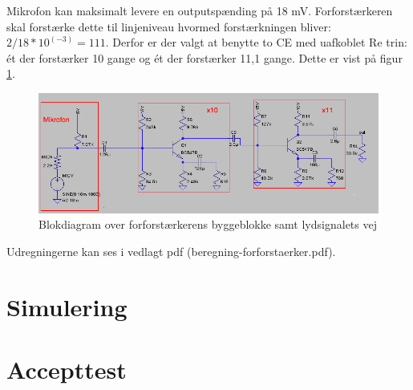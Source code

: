 Mikrofon kan maksimalt levere en outputspænding på 18 mV. Forforstærkeren skal forstærke dette til linjeniveau hvormed forstærkningen bliver: $2/18*10^(-3)=111$. Derfor er der valgt at benytte to CE med uafkoblet Re trin: ét der forstærker 10 gange og ét der forstærker 11,1 gange. Dette er vist på figur \ref{blok_forforstaerker}.

\begin{figure}[h]
\centering
\includegraphics[scale=.6]{implementering/forforstaerker/blok_forforstaerker.png}
\caption{Blokdiagram over forforstærkerens byggeblokke samt lydsignalets vej}
\label{blok_forforstaerker}
\end{figure}

Udregningerne kan ses i vedlagt pdf (beregning-forforstaerker.pdf). 


\section{Simulering}


\section{Accepttest}

